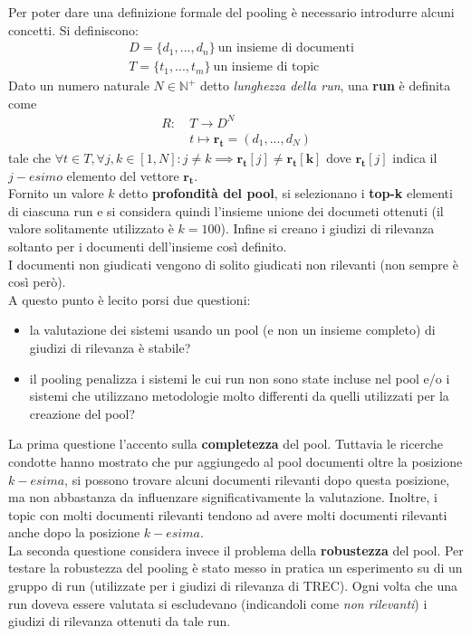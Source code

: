 \documentclass{article}
\begin{document}
Per poter dare una definizione formale del pooling è necessario introdurre alcuni concetti. Si definiscono:
\begin{align*}
&D = \{d_1, ..., d_n\} \: \text{un insieme di documenti}\\
&T = \{t_1, ..., t_m\} \: \text{un insieme di topic}
\end{align*}
Dato un numero naturale $N\in\mathbb{N}^+$ detto \textit{lunghezza della run}, una \textbf{run} è definita come
\begin{align*}
R :\: & T \to D^N\\
      & t \mapsto \mathbf{r_t} = (d_1, ..., d_N)
\end{align*}
tale che $\forall t \in T, \forall j,k \in [1,N] : j \neq k \implies \mathbf{r_t}[j] \neq \mathbf{r_t[k]}$ dove $\mathbf{r_t}[j]$ indica il $j-esimo$ elemento del vettore $\mathbf{r_t}$.\\
Fornito un valore $k$ detto \textbf{profondità del pool}, si selezionano i \textbf{top-k} elementi di ciascuna run e si considera quindi l'insieme unione dei documeti ottenuti (il valore solitamente utilizzato è $k=100$). Infine si creano i giudizi di rilevanza soltanto per i documenti dell'insieme così definito.\\
I documenti non giudicati vengono di solito giudicati non rilevanti (non sempre è così però).\\
A questo punto è lecito porsi due questioni:
\begin{itemize}
\item la valutazione dei sistemi usando un pool (e non un insieme completo) di giudizi di rilevanza è stabile?
\item il pooling penalizza i sistemi le cui run non sono state incluse nel pool e/o i sistemi che utilizzano metodologie molto differenti da quelli utilizzati per la creazione del pool? 
\end{itemize}
La prima questione l'accento sulla \textbf{completezza} del pool. Tuttavia le ricerche condotte hanno mostrato che pur aggiungedo al pool documenti oltre la posizione $k-esima$, si possono trovare alcuni documenti rilevanti dopo questa posizione, ma non abbastanza da influenzare significativamente la valutazione. Inoltre, i topic con molti documenti rilevanti tendono ad avere molti documenti rilevanti anche dopo la posizione $k-esima$.\\
La seconda questione considera invece il problema della \textbf{robustezza} del pool. Per testare la robustezza del pooling è stato messo in pratica un esperimento su di un gruppo di run (utilizzate per i giudizi di rilevanza di TREC). Ogni volta che una run doveva essere valutata si escludevano (indicandoli come \textit{non rilevanti}) i giudizi di rilevanza ottenuti da tale run.\\
\end{document}
